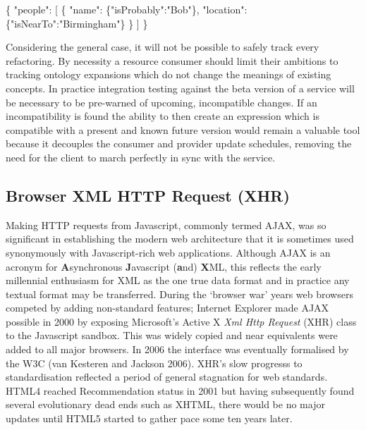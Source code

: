 \documentclass[12pt, ]{article}
\newenvironment{Shaded}{}{}
\newcommand{\StringTok}[1]{\textcolor[rgb]{0.25,0.44,0.63}{{#1}}}
\newcommand{\NormalTok}[1]{{#1}}
\begin{document}
\begin{Shaded}
\begin{Highlighting}[]
\NormalTok{\{}
   \StringTok{"people"}\NormalTok{: [}
      \NormalTok{\{  }
         \StringTok{"name"}\NormalTok{:     \{}\StringTok{"isProbably"}\NormalTok{:}\StringTok{"Bob"}\NormalTok{\},}
         \StringTok{"location"}\NormalTok{: \{}\StringTok{"isNearTo"}\NormalTok{:}\StringTok{"Birmingham"}\NormalTok{\}}
      \NormalTok{\}}
   \NormalTok{]   }
\NormalTok{\}}
\end{Highlighting}
\end{Shaded}

Considering the general case, it will not be possible to safely track
every refactoring. By necessity a resource consumer should limit their
ambitions to tracking ontology expansions which do not change the
meanings of existing concepts. In practice integration testing against
the beta version of a service will be necessary to be pre-warned of
upcoming, incompatible changes. If an incompatibility is found the
ability to then create an expression which is compatible with a present
and known future version would remain a valuable tool because it
decouples the consumer and provider update schedules, removing the need
for the client to march perfectly in sync with the service.

\subsection{Browser XML HTTP Request
(XHR)}\label{browser-xml-http-request-xhr}

Making HTTP requests from Javascript, commonly termed AJAX, was so
significant in establishing the modern web architecture that it is
sometimes used synonymously with Javascript-rich web applications.
Although AJAX is an acronym for \textbf{A}synchronous
\textbf{J}avascript (\textbf{a}nd) \textbf{X}ML, this reflects the early
millennial enthusiasm for XML as the one true data format and in
practice any textual format may be transferred. During the `browser war'
years web browsers competed by adding non-standard features; Internet
Explorer made AJAX possible in 2000 by exposing Microsoft's Active X
\emph{Xml Http Request} (XHR) class to the Javascript sandbox. This was
widely copied and near equivalents were added to all major browsers. In
2006 the interface was eventually formalised by the W3C (van Kesteren
and Jackson 2006). XHR's slow progresss to standardisation reflected a
period of general stagnation for web standards. HTML4 reached
Recommendation status in 2001 but having subsequently found several
evolutionary dead ends such as XHTML, there would be no major updates
until HTML5 started to gather pace some ten years later.
\end{document}

